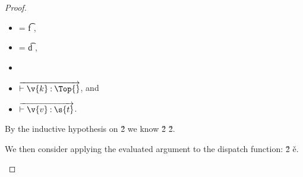 \begin{lemma}
\begin{proof}
\begin{case}[B-BetaMulti]
\begin{itemize}
\begin{subcase}[T-App]
\begin{itemize}
         \item {} = {\ArrowOne {\x{}} {\s{}}
                                                       {\t{f}}
                                                       {
                                                                   {}}
                                                       {}},
         \item {} = {\ArrowOne {\x{}} {\s{}}
                                                       {\t{d}}
                                                       {
                                                                   {}}
                                                       {}},
       \item
              \item
  $\overrightarrow{\judgementtwo{}{\v{k}}{\Top{}}}$, and 
\item
  $\overrightarrow{\judgementtwo{}{\v{v}}{\s{t}}}$.
  \end{itemize}

  By the inductive hypothesis on 
  \opsem {\openv{}}
         {}
         {\v{2}}
  we know 
  \judgementrewrite {\propenv{}} {\v{2}} {\s{}}
             {
                         {}}
                       {}
                       {\v{2}}.

We then consider applying the evaluated argument to the dispatch function:
  \opsem {\openv{}}
         { {\v{2}}}
         {\v{e}}.


\end{subcase}
\end{itemize}
\end{case}
\end{proof}
\end{lemma}
